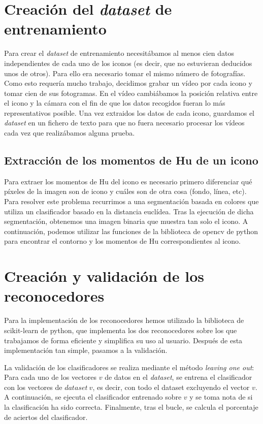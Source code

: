 \documentclass[11pt]{article}
\begin{document}
\section{Creación del \textit{dataset} de entrenamiento}

Para crear el \textit{dataset} de entrenamiento necesitábamos al menos cien datos independientes de cada uno de los iconos (es decir, que no estuvieran deducidos unos de otros). Para ello era necesario tomar el mismo número de fotografías. Como esto requería mucho trabajo, decidimos grabar un vídeo por cada icono y tomar cien de sus fotogramas. En el vídeo cambiábamos la posición relativa entre el icono y la cámara con el fin de que los datos recogidos fueran lo más representativos posible. Una vez extraidos los datos de cada icono, guardamos el \textit{dataset} en un fichero de texto para que no fuera necesario procesar los vídeos cada vez que realizábamos alguna prueba.

\subsection{Extracción de los momentos de Hu de un icono}

Para extraer los momentos de Hu del icono es necesario primero diferenciar qué píxeles de la imagen son de icono y cuáles son de otra cosa (fondo, línea, etc). Para resolver este problema recurrimos a una segmentación basada en colores que utiliza un clasificador basado en la distancia euclídea. Tras la ejecución de dicha segmentación, obtenemos una imagen binaria que muestra tan solo el icono. A continuación, podemos utilizar las funciones de la biblioteca de opencv de python para encontrar el contorno y los momentos de Hu correspondientes al icono.

\section{Creación y validación de los reconocedores}

Para la implementación de los reconocedores hemos utilizado la biblioteca de scikit-learn de python, que implementa los dos reconocedores sobre los que trabajamos de forma eficiente y simplifica su uso al usuario. Después de esta implementación tan simple, pasamos a la validación.

La validación de los clasificadores se realiza mediante el método \textit{leaving one out}: Para cada uno de los vectores $v$ de datos en el \textit{dataset}, se entrena el clasificador con los vectores de $dataset \ v$, es decir, con todo el dataset excluyendo el vector $v$. A continuación, se ejecuta el clasificador entrenado sobre $v$ y se toma nota de si la clasificación ha sido correcta. Finalmente, tras el bucle, se calcula el porcentaje de aciertos del clasificador.
\end{document}
